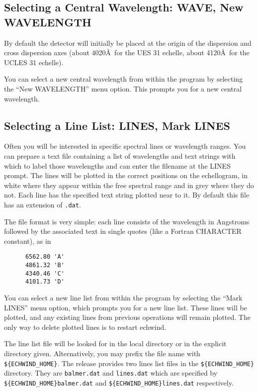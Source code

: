 \documentclass[11pt]{article}
\begin{document}
\subsection{Selecting a Central Wavelength: WAVE, New WAVELENGTH}

By default the detector will initially be placed at the origin of the
dispersion and cross dispersion axes (about 4020\AA\, for the UES 31
echelle, about 4120\AA\, for the UCLES 31 echelle).

You can select a new central wavelength from within the program by selecting
the ``New WAVELENGTH'' menu option. This prompts you for a new central
wavelength.

\subsection{Selecting a Line List: LINES, Mark LINES}

Often you will be interested in specific spectral lines or wavelength
ranges. You can prepare a text file containing a list of wavelengths and
text strings with which to label those wavelengths and can enter the
filename at the LINES prompt. The lines will be plotted in the correct
positions on the echellogram, in white where they appear within the free
spectral range and in grey where they do not. Each line has the specified
text string plotted near to it. By default this file has an extension of
{\tt .dat}.

The file format is very simple: each line
consists of the wavelength in Angstroms followed by the associated text in
single quotes (like a Fortran CHARACTER constant), as in
\begin{verbatim}
      6562.80 'A'
      4861.32 'B'
      4340.46 'C'
      4101.73 'D'
\end{verbatim}

You can select a new line list from within the program by selecting the ``Mark
LINES'' menu option, which prompts you for a new line list. These lines will
be plotted, and any existing lines from previous operations will remain
plotted. The only way to delete plotted lines is to restart echwind.

The line list file will be looked for in the local directory or in the explicit
directory given. Alternatively, you may prefix the file name with
\verb+${ECHWIND_HOME}+. The release provides two lines list files in the
\verb+${ECHWIND_HOME}+ directory. They are {\tt balmer.dat} and
{\tt lines.dat} which are specified by
\verb+${ECHWIND_HOME}balmer.dat+
and \verb+${ECHWIND_HOME}lines.dat+ respectively.
\end{document}
